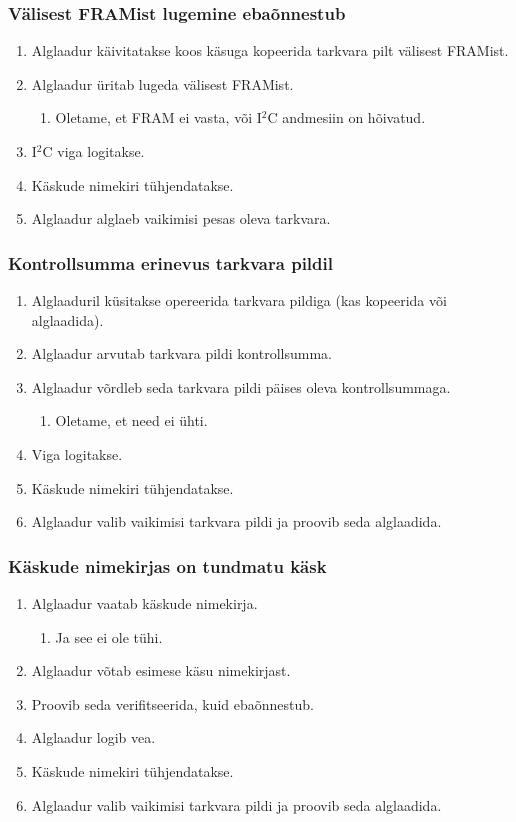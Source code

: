 \documentclass[12pt,a4paper]{article}
\newcommand{\iic}{I\({}^2\)C }
\begin{document}
\subsubsection{Välisest FRAMist lugemine ebaõnnestub}
\begin{enumerate}
	\item Alglaadur käivitatakse koos käsuga kopeerida tarkvara pilt välisest
		FRAMist.
	\item Alglaadur üritab lugeda välisest FRAMist.
		\begin{enumerate}
		\item Oletame, et FRAM ei vasta, või \iic andmesiin on hõivatud.
		\end{enumerate}
	\item \iic viga logitakse.
	\item Käskude nimekiri tühjendatakse.
	\item Alglaadur alglaeb vaikimisi pesas oleva tarkvara.
\end{enumerate}

\subsubsection{Kontrollsumma erinevus tarkvara pildil}
\begin{enumerate}
	\item Alglaaduril küsitakse opereerida tarkvara pildiga (kas kopeerida või
		alglaadida).
	\item Alglaadur arvutab tarkvara pildi kontrollsumma.
	\item Alglaadur võrdleb seda tarkvara pildi päises oleva kontrollsummaga.
		\begin{enumerate}
			\item Oletame, et need ei ühti.
		\end{enumerate}
	\item Viga logitakse.
	\item Käskude nimekiri tühjendatakse.
	\item Alglaadur valib vaikimisi tarkvara pildi ja proovib seda alglaadida.
\end{enumerate}

\subsubsection{Käskude nimekirjas on tundmatu käsk}
\begin{enumerate}
	\item Alglaadur vaatab käskude nimekirja.
		\begin{enumerate}
			\item Ja see ei ole tühi.
		\end{enumerate}
	\item Alglaadur võtab esimese käsu nimekirjast.
	\item Proovib seda verifitseerida, kuid ebaõnnestub.
	\item Alglaadur logib vea.
	\item Käskude nimekiri tühjendatakse.
	\item Alglaadur valib vaikimisi tarkvara pildi ja proovib seda alglaadida.
\end{enumerate}
\end{document}
